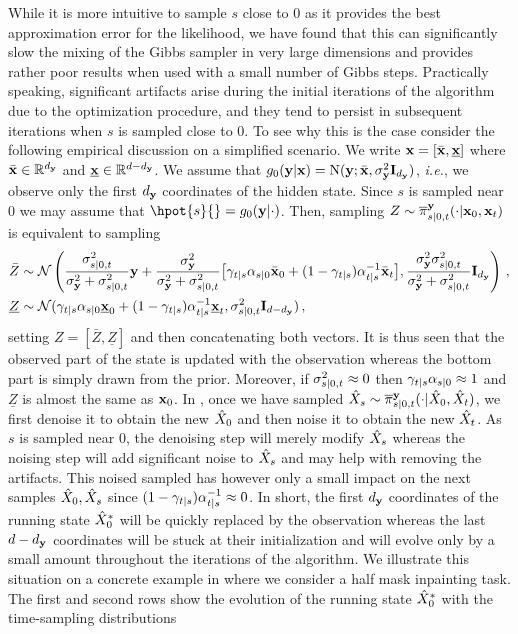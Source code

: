 While it is more intuitive to sample $s$ close to $0$ as it provides the best approximation error for the likelihood, we have found that this can significantly slow the mixing of the Gibbs sampler in very large dimensions and provides rather poor results when used with a small number of Gibbs steps. Practically speaking, significant artifacts arise during the initial iterations of the algorithm due to the optimization procedure, and they tend to persist in subsequent iterations when $s$ is sampled close to 0. To see why this is the case consider the following empirical discussion on a simplified scenario. We write $\mathbf{x} = [\bar{\mathbf{x}}, \underline{\mathbf{x}}]$  where $\bar{\mathbf{x}} \in \mathbb{R}^{d_{\mathbf{y}}}$ and $\underline{\mathbf{x}} \in \mathbb{R}^{{d} - {d_{\mathbf{y}}}}$. 
We assume that $\pot{0}{\bx} = \normpdf(\obs; \bar\bx, \stdobs^2 \Id_\dimobs)$, \emph{i.e.}, we observe only the first ${d_{\mathbf{y}}}$ coordinates of the hidden state. Since $s$ is sampled near $0$ we may assume that $\hpot{s}{} = \pot{0}{}$. Then, sampling $Z \sim \epost{s|0, t}{\bx_0, \bx_t}{}$  is equivalent to sampling 
\begin{align*}
    \bar{Z} & \sim \mathcal{N}\left(\frac{\sigma^2 _{s|0, t}}{\sigma_{\mathbf{y}}^2 + \sigma^2 _{s|0,t}} {\mathbf{y}} + \frac{\sigma_{\mathbf{y}}^2}{\sigma_{\mathbf{y}}^2 + \sigma^2 _{s|0, t}} \big[ \gamma_{t|s} \alpha_{s|0} \bar{\mathbf{x}}_0 + (1 - \gamma_{t|s}) \alpha^{-1} _{t|s} \bar{\mathbf{x}}_t\big], \frac{\sigma_{\mathbf{y}}^2 \sigma^2 _{s|0,t}}{\sigma_{\mathbf{y}}^2 + \sigma^2 _{s|0,t}} \mathbf{I}_{d_{\mathbf{y}}}\right) \,, \\
    \underline{Z} & \sim \mathcal{N}(\gamma_{t|s} \alpha_{s|0} \underline{\mathbf{x}}_0 + (1 - \gamma_{t|s}) \alpha^{-1} _{t|s} \underline{\mathbf{x}}_t, \sigma^2 _{s|0,t} \mathbf{I}_{{d} - {d_{\mathbf{y}}}}) \,,
\end{align*}
setting $Z = [\bar{Z}, \underline{Z}]$ and then concatenating both vectors. It is thus seen that the observed part of the state is updated with the observation whereas the bottom part is simply drawn from the prior. Moreover, if $\sigma^2 _{\smash{s|0, t}} \approx 0$ then $\gamma_{t|s} \alpha_{s|0} \approx 1$ and $\underline{Z}$ is almost the same as $\mathbf{x}_0$.  In , once we have sampled $\vX_s \sim \epost{\smash{s|0,t}}{\vX_0, \vX_t}{}$, we first denoise it to obtain the new $\hat{X}_0$ and then noise it to obtain the new $\hat{X}_t$. As $s$ is sampled near 0, the denoising step will merely modify $\hat{X}_s$ whereas the noising step will add significant noise to $\hat{X}_s$ and may help with removing the artifacts. This noised sampled has however only a small impact on the next samples $\hat{X}_0, \hat{X}_s$ since $(1 - \gamma_{t|s}) \alpha^{-1} _{t|s} \approx 0$. In short, the first ${d_{\mathbf{y}}}$ coordinates of the running state $\hat{X}^* _0$ will be quickly replaced by the observation whereas the last ${d} - {d_{\mathbf{y}}}$ coordinates will be stuck at their initialization and will evolve only by a small amount throughout the iterations of the algorithm. We illustrate this situation on a concrete example in  where we consider a half mask inpainting task. The first and second rows show the evolution of the running state $\hat{X}^* _0$ with the time-sampling distributions  
